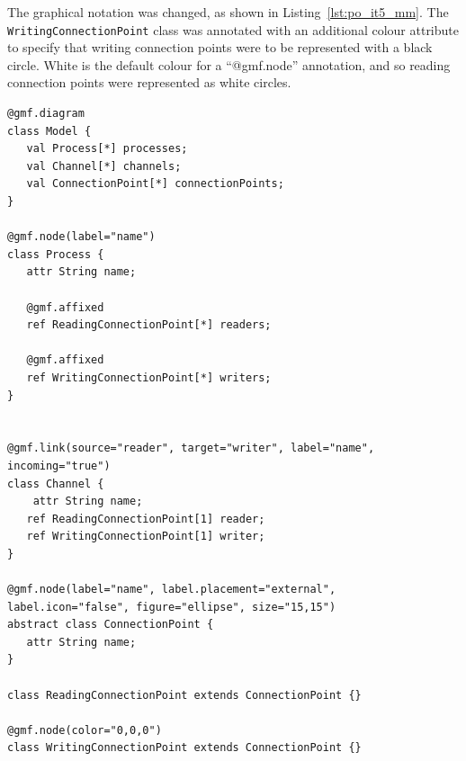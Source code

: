 The graphical notation was changed, as shown in Listing~\ref{lst:po_it5_mm}. The \texttt{Wr\-i\-ti\-ngCo\-nn\-ec\-ti\-o\-nP\-oi\-nt} class was annotated with an additional colour attribute to specify that writing connection points were to be represented with a black circle. White is the default colour for a ``@gmf.node'' annotation, and so reading connection points were represented as white circles.

\begin{lstlisting}[caption=The annotated process-oriented metamodel after five iterations, label=lst:po_it5_mm, language=Emfatic]
@gmf.diagram
class Model {
   val Process[*] processes;
   val Channel[*] channels;
   val ConnectionPoint[*] connectionPoints;
}

@gmf.node(label="name")
class Process {
   attr String name;
      
   @gmf.affixed
   ref ReadingConnectionPoint[*] readers;
   
   @gmf.affixed
   ref WritingConnectionPoint[*] writers; 
}


@gmf.link(source="reader", target="writer", label="name", incoming="true")
class Channel { 
	attr String name;
   ref ReadingConnectionPoint[1] reader;
   ref WritingConnectionPoint[1] writer;
}

@gmf.node(label="name", label.placement="external", label.icon="false", figure="ellipse", size="15,15")
abstract class ConnectionPoint {
   attr String name;
}

class ReadingConnectionPoint extends ConnectionPoint {}

@gmf.node(color="0,0,0")
class WritingConnectionPoint extends ConnectionPoint {}
\end{lstlisting}


